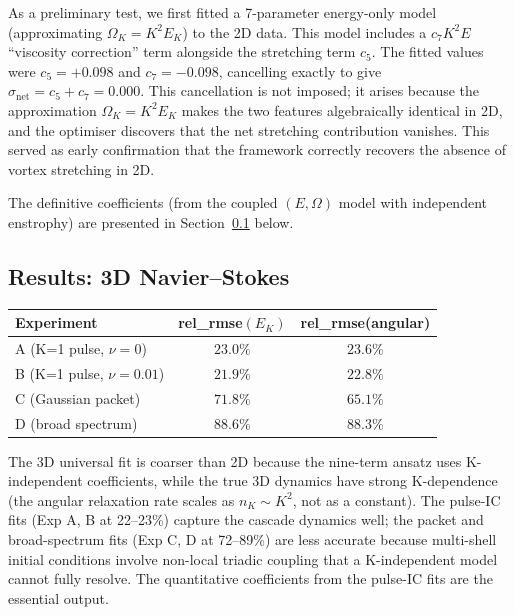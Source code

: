 \documentclass[11pt,a4paper]{article}
\theoremstyle{remark}
\begin{document}
As a preliminary test, we first fitted a 7-parameter energy-only model (approximating $\Omega_K = K^2 E_K$) to the 2D data.  This model includes a $c_7 K^2 E$ ``viscosity correction'' term alongside the stretching term $c_5$.  The fitted values were $c_5 = +0.098$ and $c_7 = -0.098$, cancelling exactly to give $\sigma_{\mathrm{net}} = c_5 + c_7 = 0.000$.  This cancellation is not imposed; it arises because the approximation $\Omega_K = K^2 E_K$ makes the two features algebraically identical in 2D, and the optimiser discovers that the net stretching contribution vanishes.  This served as early confirmation that the framework correctly recovers the absence of vortex stretching in 2D.

The definitive coefficients (from the coupled $(E, \Omega)$ model with independent enstrophy) are presented in Section~\ref{sec:results-3d} below.

\subsection{Results: 3D Navier--Stokes}\label{sec:results-3d}

\begin{center}
\begin{tabular}{lcc}
\toprule
Experiment & rel\_rmse$(E_K)$ & rel\_rmse(angular) \\
\midrule
A (K=1 pulse, $\nu=0$)           & $23.0\%$ & $23.6\%$ \\
B (K=1 pulse, $\nu=0.01$)        & $21.9\%$ & $22.8\%$ \\
C (Gaussian packet)                & $71.8\%$ & $65.1\%$ \\
D (broad spectrum)                 & $88.6\%$ & $88.3\%$ \\
\bottomrule
\end{tabular}
\end{center}

The 3D universal fit is coarser than 2D because the nine-term ansatz uses K-independent coefficients, while the true 3D dynamics have strong K-dependence (the angular relaxation rate scales as $n_K \sim K^2$, not as a constant).  The pulse-IC fits (Exp A, B at 22--23\%) capture the cascade dynamics well; the packet and broad-spectrum fits (Exp C, D at 72--89\%) are less accurate because multi-shell initial conditions involve non-local triadic coupling that a K-independent model cannot fully resolve.  The quantitative coefficients from the pulse-IC fits are the essential output.
\end{document}
